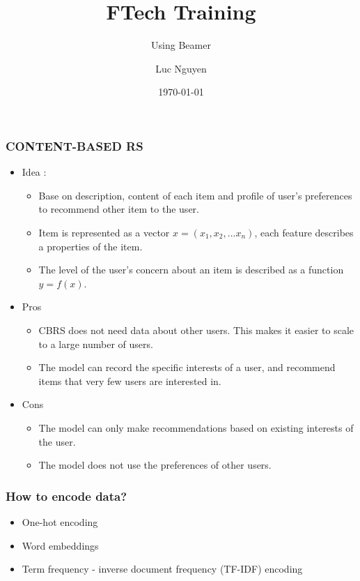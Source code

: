 \documentclass[11pt]{beamer}
\title{FTech Training}
\subtitle{Using Beamer}
\author{Luc Nguyen}
\institute{HUST}
\date{\today}
\begin{document}
\begin{frame}
\frametitle{\textbf{CONTENT-BASED RS}}
\begin{itemize}
\pause
\item Idea  : 
\begin{itemize}
	\item Base on description, content of each item and profile of user's preferences to recommend other item to the user.
	\item Item is represented as a vector $x = (x_1, x_2, ... x_n)$, each feature describes a properties of the item.
	\item The level of the user's concern about an item is described as a function $y = f(x) $.
\end{itemize}
\pause
\item Pros
\begin{itemize}
	\item CBRS does not need data about other users. This makes it easier to scale to a large number of users.
	\item The model can record the specific interests of a user, and recommend items that very few users are interested in.

\end{itemize}
\pause
\item Cons
	\begin{itemize}
	\item The model can only make recommendations based on existing interests of the user.
	\item The model does not use the preferences of other users.
	\end{itemize}
\end{itemize}
\end{frame}

\begin{frame}
\frametitle{How to encode data?}
\pause
\begin{itemize}
\item One-hot encoding
\item Word embeddings
\item Term frequency - inverse document frequency (TF-IDF) encoding
\end{itemize}
\end{frame}
\end{document}

